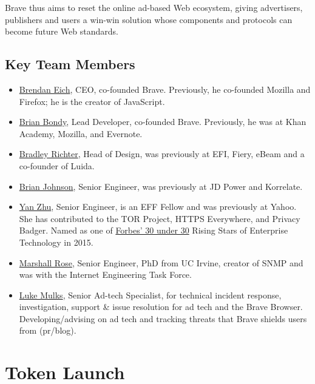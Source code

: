 \documentclass[11pt]{article}
\begin{document}
Brave thus aims to reset the online ad-based Web ecosystem, giving advertisers, publishers and users a win-win solution whose components and protocols can become future Web standards. 
\subsection{Key Team Members}
\label{sec-5-4}
\begin{itemize}
\item{\href{https://www.linkedin.com/in/brendaneich}{Brendan Eich}, CEO, co-founded Brave. Previously, he co-founded Mozilla and Firefox; he is the creator of JavaScript.}
\item{\href{https://www.linkedin.com/in/bbondy/}{Brian Bondy}, Lead Developer, co-founded Brave. Previously, he was at Khan Academy, Mozilla, and Evernote.}
\item{\href{https://www.linkedin.com/in/richterbrad/}{Bradley Richter}, Head of Design, was previously at  EFI, Fiery, eBeam and a co-founder of Luida.}
\item{\href{https://www.linkedin.com/in/brian-johnson-aaa11018/}{Brian Johnson}, Senior Engineer, was previously at JD Power and Korrelate.}
\item{\href{https://www.linkedin.com/in/yan-zhu-b7124227/}{Yan Zhu}, Senior Engineer, is an EFF Fellow and was previously at Yahoo. She has contributed to the TOR Project, HTTPS Everywhere, and Privacy Badger. Named as one of \href{https://www.forbes.com/sites/bruceupbin/2015/01/05/meet-the-30-under-30-rising-stars-in-enterprise-technology/}{Forbes’ 30 under 30} Rising Stars of Enterprise Technology in 2015.}
\item{\href{https://www.linkedin.com/in/marshallrose}{Marshall Rose}, Senior Engineer, PhD from UC Irvine, creator of SNMP and was with the Internet Engineering Task Force.}
\item{\href{https://www.linkedin.com/in/pureproductions/}{Luke Mulks}, Senior Ad-tech Specialist, for technical incident response, investigation, support \& issue resolution for ad tech and the Brave Browser. Developing/advising on ad tech and tracking threats that Brave shields users from (pr/blog).}
\end{itemize}

\section{Token Launch}
\label{sec-6}
\end{document}
